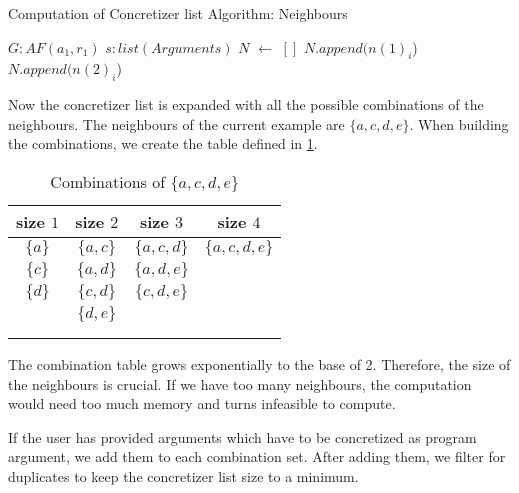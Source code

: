 \begin{algorithm}
    \caption{Computation of Concretizer list Algorithm: Neighbours}\label{alg:concretizerListNeighbours}
    \begin{algorithmic}[1]
        \Require $G: AF(a_1, r_1)$ 
        \Require $s: list(Arguments)$ 
        \State $N$ $\gets$ $[]$ 
         
             
                 
                    \State $N.append(n(1)_i$)
                    \State $N.append(n(2)_i$)
                \EndFor
            \EndFor
        \EndFor
    \end{algorithmic}
\end{algorithm}


Now the concretizer list is expanded with all the possible combinations of the neighbours. The neighbours of the current example are $\{a, c, d, e\}$. When building the combinations, we create the table defined in \cref{table:algorithmConcretizer1}.

\begin{table}[htb]
    \centering
    \caption{Combinations of $\{a, c, d, e\}$}
    \begin{tabular}{ |c|c|c|c| }
     \hline
     size $1$ & size $2$ & size $3$ & size $4$\\
     \hline
     \hline
     $\{a\}$ & $\{a, c\}$ & $\{a, c, d\}$ &$\{a, c, d, e\}$ \\
     \hline
     $\{c\}$ & $\{a, d\}$ & $\{a, d, e\}$ & \\
     \hline
     $\{d\}$ & $\{c, d\}$ & $\{c, d, e\}$ & \\
     \hline
      & $\{d, e\}$ &  & \\
     \hline
       &  &  & \\
     \hline
       &  &  & \\
     \hline
    \end{tabular}
\label{table:algorithmConcretizer1}
\end{table}

The combination table grows exponentially to the base of 2. Therefore, the size of the neighbours is crucial. If we have too many neighbours, the computation would need too much memory and turns infeasible to compute.

If the user has provided arguments which have to be concretized as program argument, we add them to each combination set. After adding them, we filter for duplicates to keep the concretizer list size to a minimum.

